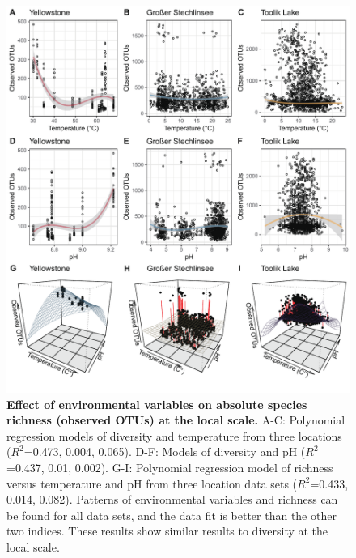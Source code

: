 \begin{figure}[H]
    \centering
    \includegraphics[scale=0.8]{./Figures/OO_PM_local_1and2EVs_3D}
    \caption{\textbf{Effect of environmental variables on absolute species richness (observed OTUs) at the local scale.} A-C: Polynomial regression models of diversity and temperature from three locations ($R^{2}$=0.473, 0.004, 0.065). D-F: Models of diversity and pH ($R^{2}$=0.437, 0.01, 0.002). G-I: Polynomial regression model of richness versus temperature and pH from three location data sets ($R^{2}$=0.433, 0.014, 0.082). Patterns of environmental variables and richness can be found for all data sets, and the data fit is better than the other two indices. These results show similar results to diversity at the local scale.}
    \label{fig:OO_PM_local_1and2EVs}
\end{figure}

